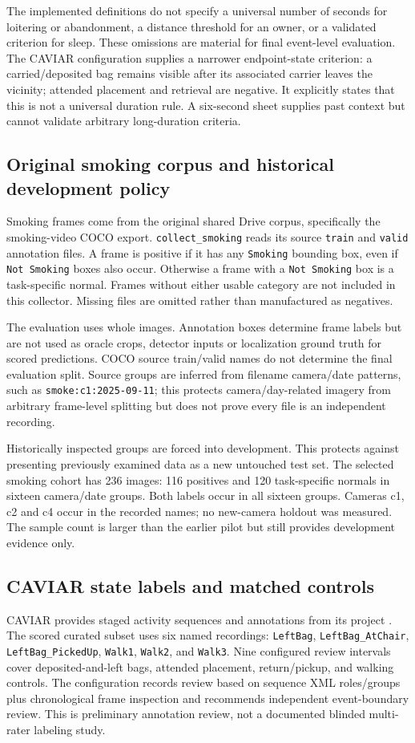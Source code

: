 \documentclass[11pt,a4paper]{article}
\newcommand{\code}[1]{\nolinkurl{#1}}
\begin{document}
The implemented definitions do not specify a universal number of seconds for loitering or abandonment, a distance threshold for an owner, or a validated criterion for sleep. These omissions are material for final event-level evaluation. The CAVIAR configuration supplies a narrower endpoint-state criterion: a carried/deposited bag remains visible after its associated carrier leaves the vicinity; attended placement and retrieval are negative. It explicitly states that this is not a universal duration rule. A six-second sheet supplies past context but cannot validate arbitrary long-duration criteria.

\subsection{Original smoking corpus and historical development policy}
Smoking frames come from the original shared Drive corpus, specifically the smoking-video COCO export. \code{collect_smoking} reads its source \code{train} and \code{valid} annotation files. A frame is positive if it has any \code{Smoking} bounding box, even if \code{Not Smoking} boxes also occur. Otherwise a frame with a \code{Not Smoking} box is a task-specific normal. Frames without either usable category are not included in this collector. Missing files are omitted rather than manufactured as negatives.

The evaluation uses whole images. Annotation boxes determine frame labels but are not used as oracle crops, detector inputs or localization ground truth for scored predictions. COCO source train/valid names do not determine the final evaluation split. Source groups are inferred from filename camera/date patterns, such as \code{smoke:c1:2025-09-11}; this protects camera/day-related imagery from arbitrary frame-level splitting but does not prove every file is an independent recording.

Historically inspected groups are forced into development. This protects against presenting previously examined data as a new untouched test set. The selected smoking cohort has 236 images: 116 positives and 120 task-specific normals in sixteen camera/date groups. Both labels occur in all sixteen groups. Cameras c1, c2 and c4 occur in the recorded names; no new-camera holdout was measured. The sample count is larger than the earlier pilot but still provides development evidence only.

\subsection{CAVIAR state labels and matched controls}
CAVIAR provides staged activity sequences and annotations from its project \cite{caviar}. The scored curated subset uses six named recordings: \code{LeftBag}, \code{LeftBag_AtChair}, \code{LeftBag_PickedUp}, \code{Walk1}, \code{Walk2}, and \code{Walk3}. Nine configured review intervals cover deposited-and-left bags, attended placement, return/pickup, and walking controls. The configuration records review based on sequence XML roles/groups plus chronological frame inspection and recommends independent event-boundary review. This is preliminary annotation review, not a documented blinded multi-rater labeling study.
\end{document}
